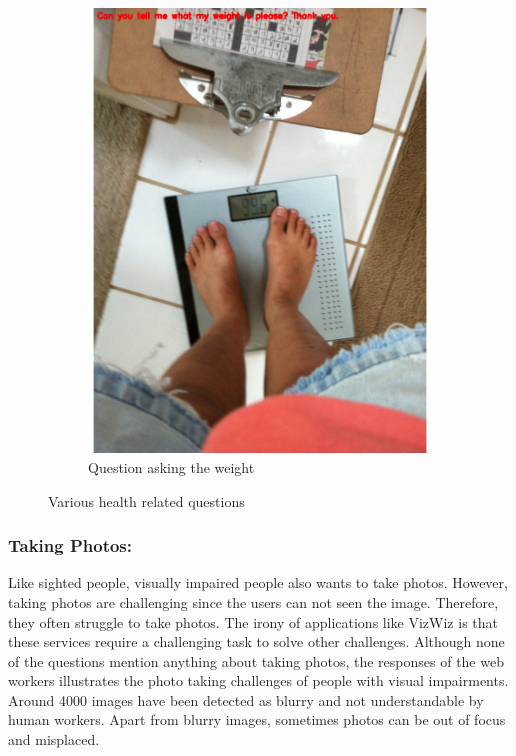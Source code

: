 \documentclass[sigconf]{acmart}
\begin{document}
\begin{figure}[hbp]
\begin{subfigure}[b]{0.3\columnwidth}
                \includegraphics[width=\textwidth]{images/health_3.pdf} 
                 \caption{Question asking the weight}
                 \label{fig:weight}
        \end{subfigure}%
        \caption{Various health related questions} 
        \label{fig:health}
\end{figure}

\subsubsection{Taking Photos:} Like sighted people, visually impaired people also wants to take photos. However, taking photos are challenging since the users can not seen the image. Therefore, they often struggle to take photos. The irony of applications like VizWiz is that these services require a challenging task to solve other challenges. Although none of the questions mention anything about taking photos, the responses of the web workers illustrates the photo taking challenges of people with visual impairments. Around 4000 images have been detected as blurry and not understandable by human workers. Apart from blurry images, sometimes photos can be out of focus and misplaced. 
\end{document}

